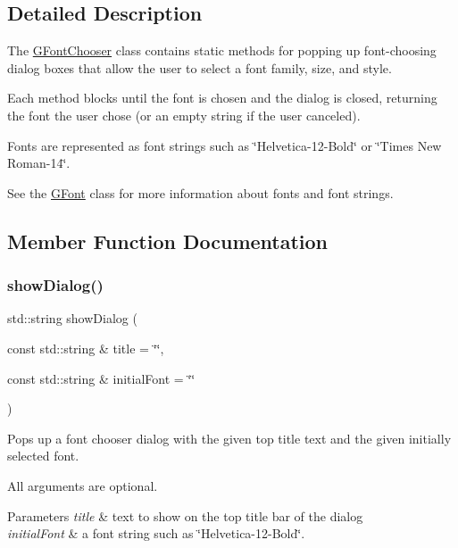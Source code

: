 \subsection{Detailed Description}
The \mbox{\hyperlink{classGFontChooser}{G\+Font\+Chooser}} class contains static methods for popping up font-\/choosing dialog boxes that allow the user to select a font family, size, and style. 

Each method blocks until the font is chosen and the dialog is closed, returning the font the user chose (or an empty string if the user canceled).

Fonts are represented as font strings such as \char`\"{}\+Helvetica-\/12-\/\+Bold\char`\"{} or \char`\"{}\+Times New Roman-\/14\char`\"{}.

See the \mbox{\hyperlink{classGFont}{G\+Font}} class for more information about fonts and font strings. 

\subsection{Member Function Documentation}
\mbox{\label{classGFontChooser_a93eece7081780910ac5878dc6c809f94}} 
\subsubsection{\texorpdfstring{show\+Dialog()}{showDialog()}\hspace{0.1cm}{\footnotesize\ttfamily [1/3]}}
{\footnotesize\ttfamily std\+::string show\+Dialog (\begin{DoxyParamCaption}\item[{const std\+::string \&}]{title = {\ttfamily \char`\"{}\char`\"{}},  }\item[{const std\+::string \&}]{initial\+Font = {\ttfamily \char`\"{}\char`\"{}} }\end{DoxyParamCaption})\hspace{0.3cm}{\ttfamily [static]}}



Pops up a font chooser dialog with the given top title text and the given initially selected font. 

All arguments are optional. 
\begin{DoxyParams}{Parameters}
{\em title} & text to show on the top title bar of the dialog \\
\hline
{\em initial\+Font} & a font string such as \char`\"{}\+Helvetica-\/12-\/\+Bold\char`\"{}. \\
\hline
\end{DoxyParams}
\mbox{\label{classGFontChooser_a67dee62efca9f2c7fb6d80891a73c32f}} 
